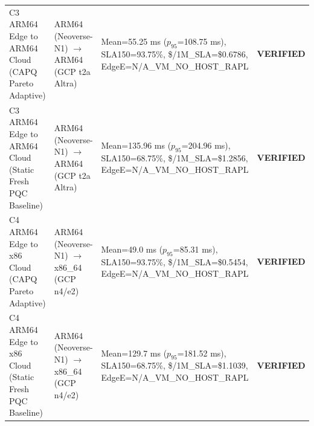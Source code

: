 \documentclass[10pt,journal,compsoc]{IEEEtran}
\begin{document}
\begin{table}[!htbp]
\begin{tabular}{@{}lllc@{}}
C3 ARM64 Edge to ARM64 Cloud (CAPQ Pareto Adaptive) & ARM64 (Neoverse-N1) $\to$ ARM64 (GCP t2a Altra) & Mean=55.25 ms ($p_{95}$=108.75 ms), SLA150=93.75\%, \$/1M\_SLA=\$0.6786, EdgeE=N/A\_VM\_NO\_HOST\_RAPL & \textbf{VERIFIED} \\
C3 ARM64 Edge to ARM64 Cloud (Static Fresh PQC Baseline) & ARM64 (Neoverse-N1) $\to$ ARM64 (GCP t2a Altra) & Mean=135.96 ms ($p_{95}$=204.96 ms), SLA150=68.75\%, \$/1M\_SLA=\$1.2856, EdgeE=N/A\_VM\_NO\_HOST\_RAPL & \textbf{VERIFIED} \\
C4 ARM64 Edge to x86 Cloud (CAPQ Pareto Adaptive) & ARM64 (Neoverse-N1) $\to$ x86\_64 (GCP n4/e2) & Mean=49.0 ms ($p_{95}$=85.31 ms), SLA150=93.75\%, \$/1M\_SLA=\$0.5454, EdgeE=N/A\_VM\_NO\_HOST\_RAPL & \textbf{VERIFIED} \\
C4 ARM64 Edge to x86 Cloud (Static Fresh PQC Baseline) & ARM64 (Neoverse-N1) $\to$ x86\_64 (GCP n4/e2) & Mean=129.7 ms ($p_{95}$=181.52 ms), SLA150=68.75\%, \$/1M\_SLA=\$1.1039, EdgeE=N/A\_VM\_NO\_HOST\_RAPL & \textbf{VERIFIED} \\
\bottomrule\end{tabular}\end{table}

\clearpage
\end{document}
